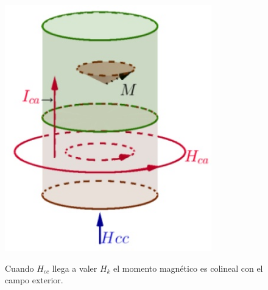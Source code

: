 \begin{figure}[H]
  \begin{minipage}[b]{0.47\textwidth}
     \includegraphics[width=0.8\textwidth]{./Figures/fig327}
	\label{fig:327}
  \end{minipage}
  \hfill
  \begin{minipage}[b]{0.47\textwidth}
Cuando $H_{cc}$ llega a valer $H_{k}$ el momento magnético es colineal con el campo exterior.
  \vspace{2cm}
  \end{minipage}
\end{figure}

